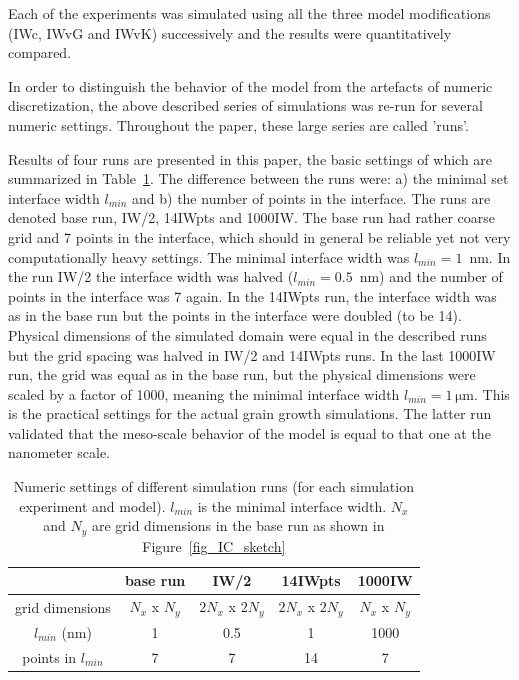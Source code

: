 Each of the experiments was simulated using all the three model modifications (IWc, IWvG and IWvK) successively and the results were quantitatively compared. 

In order to distinguish the behavior of the model from the artefacts of numeric discretization, the above described series of simulations was re-run for several numeric settings. Throughout the paper, these large series are called 'runs'. 

Results of four runs are presented in this paper, the basic settings of which are summarized in Table~\ref{tab_IW_settings}. The difference between the runs were: a) the minimal set interface width $l_{min}$ and b) the number of points in the interface. The runs are denoted base run, IW/2, 14IWpts and 1000IW. The base run had rather coarse grid and 7 points in the interface, which should in general be reliable yet not very computationally heavy settings. The minimal interface width was $l_{min}=1$~nm. In the run IW/2 the interface width was halved ($l_{min}=0.5$~nm) and the number of points in the interface was 7 again. In the 14IWpts run, the interface width was as in the base run but the points in the interface were doubled (to be 14). Physical dimensions of the simulated domain were equal in the described runs but the grid spacing was halved in IW/2 and 14IWpts runs. In the last 1000IW run, the grid was equal as in the base run, but the physical dimensions were scaled by a factor of 1000, meaning the minimal interface width $l_{min}=1\,\mathrm{\mu m}$. This is the practical settings for the actual grain growth simulations. The latter run validated that the meso-scale behavior of the model is equal to that one at the nanometer scale.

\begin{table}[]
	\centering
	\caption[PF simulation - numeric settings of different simulation runs]{Numeric settings of different simulation runs (for each simulation experiment and model). $l_{min}$ is the minimal interface width. $N_x$ and $N_y$ are grid dimensions in the base run as shown in Figure~\ref{fig_IC_sketch}}
	\label{tab_IW_settings}
	\begin{tabular}{c|c|c|c|c}
		\toprule
		& base run & IW/2 & 14IWpts & 1000IW \\ \hline
		grid dimensions & $N_x$ x $N_y$ & $2N_x$ x $2N_y$ & $2N_x$ x $2N_y$ & $N_x$ x $N_y$ \\
		$l_{min}$ (nm) & 1 & 0.5 & 1 & 1000 \\
		points in $l_{min}$ & 7 & 7 & 14 & 7 \\
		\bottomrule
	\end{tabular}
\end{table}

